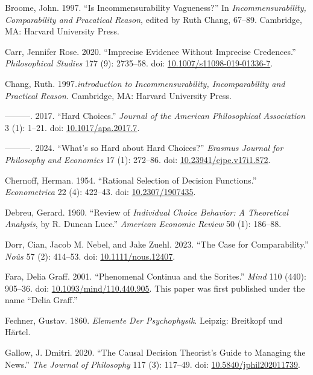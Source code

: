 \documentclass[
  11pt,
  letterpaper,
  DIV=11,
  numbers=noendperiod,
  twoside]{scrartcl}
\newlength{\cslhangindent}
\newenvironment{CSLReferences}[2] %
 {\begin{list}{}{%
  \setlength{\itemindent}{0pt}
  \setlength{\leftmargin}{0pt}
  \setlength{\parsep}{0pt}
  \ifodd #1
   \setlength{\leftmargin}{\cslhangindent}
   \setlength{\itemindent}{-1\cslhangindent}
  \fi
  \setlength{\itemsep}{#2\baselineskip}}}
 {\end{list}}
\begin{document}
\begin{CSLReferences}{1}{0}
Broome, John. 1997. {``Is Incommensurability Vagueness?''} In
\emph{Incommensurability, Comparability and Pracatical Reason}, edited
by Ruth Chang, 67--89. Cambridge, MA: Harvard University Press.

Carr, Jennifer Rose. 2020. {``Imprecise Evidence Without Imprecise
Credences.''} \emph{Philosophical Studies} 177 (9): 2735--58. doi:
\href{https://doi.org/10.1007/s11098-019-01336-7}{10.1007/s11098-019-01336-7}.

Chang, Ruth. 1997\emph{.introduction to Incommensurability,
Incomparability and Practical Reason.} Cambridge, MA: Harvard University
Press.

---------. 2017. {``Hard Choices.''} \emph{Journal of the American
Philosophical Association} 3 (1): 1--21. doi:
\href{https://doi.org/10.1017/apa.2017.7}{10.1017/apa.2017.7}.

---------. 2024. {``What's so Hard about Hard Choices?''} \emph{Erasmus
Journal for Philosophy and Economics} 17 (1): 272--86. doi:
\href{https://doi.org/10.23941/ejpe.v17i1.872}{10.23941/ejpe.v17i1.872}.

Chernoff, Herman. 1954. {``Rational Selection of Decision Functions.''}
\emph{Econometrica} 22 (4): 422--43. doi:
\href{https://doi.org/10.2307/1907435}{10.2307/1907435}.

Debreu, Gerard. 1960. {``Review of \emph{Individual Choice Behavior: A
Theoretical Analysis}, by {R. Duncan Luce}.''} \emph{American Economic
Review} 50 (1): 186--88.

Dorr, Cian, Jacob M. Nebel, and Jake Zuehl. 2023. {``The Case for
Comparability.''} \emph{Noûs} 57 (2): 414--53. doi:
\href{https://doi.org/10.1111/nous.12407}{10.1111/nous.12407}.

Fara, Delia Graff. 2001. {``Phenomenal Continua and the Sorites.''}
\emph{Mind} 110 (440): 905--36. doi:
\href{https://doi.org/10.1093/mind/110.440.905}{10.1093/mind/110.440.905}.
This paper was first published under the name {``Delia Graff.''}

Fechner, Gustav. 1860. \emph{Elemente Der Psychophysik}. Leipzig:
Breitkopf und H{ä}rtel.

Gallow, J. Dmitri. 2020. {``The Causal Decision Theorist's Guide to
Managing the News.''} \emph{The Journal of Philosophy} 117 (3): 117--49.
doi:
\href{https://doi.org/10.5840/jphil202011739}{10.5840/jphil202011739}.


\end{CSLReferences}
\end{document}
